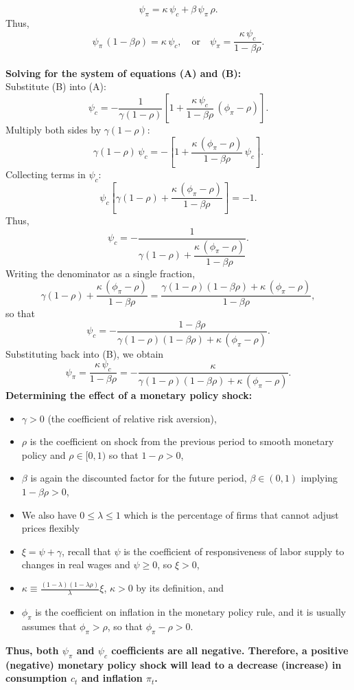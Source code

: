\documentclass[12pt]{article}
\begin{document}
\[
\psi_\pi = \kappa\,\psi_c + \beta\,\psi_\pi\,\rho.
\]
Thus,
\[
\psi_\pi\,(1-\beta\rho) = \kappa\,\psi_c,\quad\text{or}\quad \psi_\pi = \frac{\kappa\,\psi_c}{1-\beta\rho}. \tag{B}
\]\\
\textbf{Solving for the system of equations (A) and (B):}\\
Substitute (B) into (A):
\[
\psi_c = -\frac{1}{\gamma(1-\rho)}\left[1 + \frac{\kappa\,\psi_c}{1-\beta\rho}\,(\phi_\pi-\rho)\right].
\]
Multiply both sides by \(\gamma(1-\rho)\):
\[
\gamma(1-\rho)\,\psi_c = -\left[1 + \frac{\kappa\,(\phi_\pi-\rho)}{1-\beta\rho}\,\psi_c\right].
\]
Collecting terms in \(\psi_c\):
\[
\psi_c\left[\gamma(1-\rho) + \frac{\kappa\,(\phi_\pi-\rho)}{1-\beta\rho}\right] = -1.
\]
Thus,
\[
\psi_c = -\frac{1}{\gamma(1-\rho) + \dfrac{\kappa\,(\phi_\pi-\rho)}{1-\beta\rho}}.
\]
Writing the denominator as a single fraction,
\[
\gamma(1-\rho) + \frac{\kappa\,(\phi_\pi-\rho)}{1-\beta\rho} = \frac{\gamma(1-\rho)(1-\beta\rho) + \kappa\,(\phi_\pi-\rho)}{1-\beta\rho},
\]
so that
\[
\psi_c = -\frac{1-\beta\rho}{\gamma(1-\rho)(1-\beta\rho) + \kappa\,(\phi_\pi-\rho)}.
\]
Substituting back into (B), we obtain
\[
\psi_\pi = \frac{\kappa\,\psi_c}{1-\beta\rho} = -\frac{\kappa}{\gamma(1-\rho)(1-\beta\rho) + \kappa\,(\phi_\pi-\rho)}.
\]
\textbf{Determining the effect of a monetary policy shock:}\\
\begin{itemize}
    \item \(\gamma > 0\) (the coefficient of relative risk aversion),
    \item $\rho$ is the coefficient on shock from the previous period to smooth monetary policy and \(\rho \in [0,1)\) so that \(1-\rho > 0\), 
    \item $\beta$ is again the discounted factor for the future period, \(\beta \in (0,1)\) implying \(1-\beta\rho > 0\),
    \item  We also have $0\leq\lambda\leq1$ which is the percentage of firms that cannot adjust prices flexibly
    \item $\xi=\psi+\gamma$, recall that $\psi$ is the coefficient of responsiveness of labor supply to changes in real wages and $\psi \geq 0$, so $\xi > 0$,
    \item $\kappa \equiv \frac{(1-\lambda)(1-\lambda\rho)}{\lambda}\xi$, \(\kappa > 0\) by its definition, and
    \item $\phi_\pi$ is the coefficient on inflation in the monetary policy rule, and it is usually assumes that \(\phi_\pi > \rho\), so that \(\phi_\pi - \rho > 0\).
\end{itemize}
\textbf{Thus, both \(\psi_\pi\) and \(\psi_c\) coefficients are all negative. Therefore, a positive (negative) monetary policy shock will lead to a decrease (increase) in consumption $c_t$ and inflation $\pi_t$.}
\end{document}
